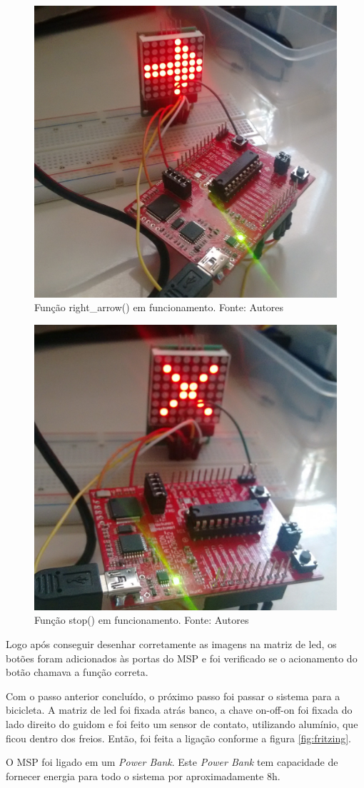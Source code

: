 \documentclass[conference]{IEEEtran}
\begin{document}
\begin{figure}[H]
  \centering
  \includegraphics[width=0.5\linewidth]{dir}
  \caption{Função right\_arrow() em funcionamento. Fonte: Autores}
  \label{fig:dir}
\end{figure}

\begin{figure}[H]
  \centering
  \includegraphics[width=0.5\linewidth]{parada}
  \caption{Função stop() em funcionamento. Fonte: Autores}
  \label{fig:parada}
\end{figure}

Logo após conseguir desenhar corretamente as imagens na matriz de led, os botões foram adicionados às portas do MSP e foi verificado se o acionamento do botão chamava a função correta. 

Com o passo anterior concluído, o próximo passo foi passar o sistema para a bicicleta. A matriz de led foi fixada atrás banco, a chave on-off-on foi fixada do lado direito do guidom e foi feito um sensor de contato, utilizando alumínio, que ficou dentro dos freios. Então, foi feita a ligação conforme a figura \ref{fig:fritzing}.

O MSP foi ligado em um \textit{Power Bank}. Este \textit{Power Bank} tem capacidade de fornecer energia para todo o sistema por aproximadamente 8h. 
\end{document}
